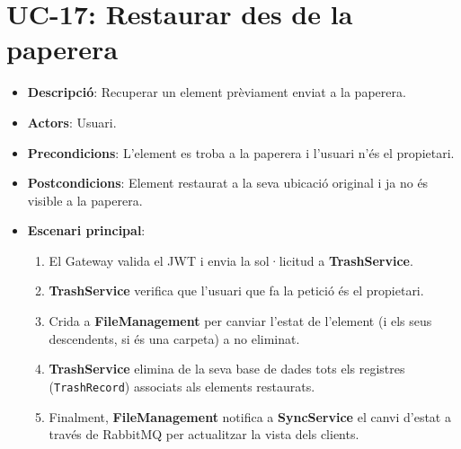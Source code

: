 \section{UC-17: Restaurar des de la paperera}
\begin{itemize}
    \item \textbf{Descripció}: Recuperar un element prèviament enviat a la paperera.
    \item \textbf{Actors}: Usuari.
    \item \textbf{Precondicions}: L'element es troba a la paperera i l'usuari n'és el propietari.
    \item \textbf{Postcondicions}: Element restaurat a la seva ubicació original i ja no és visible a la paperera.
    \item \textbf{Escenari principal}:
    \begin{enumerate}
        \item El Gateway valida el JWT i envia la sol·licitud a \textbf{TrashService}.
        \item \textbf{TrashService} verifica que l'usuari que fa la petició és el propietari.
        \item Crida a \textbf{FileManagement} per canviar l'estat de l'element (i els seus descendents, si és una carpeta) a no eliminat.
        \item \textbf{TrashService} elimina de la seva base de dades tots els registres (\texttt{TrashRecord}) associats als elements restaurats.
        \item Finalment, \textbf{FileManagement} notifica a \textbf{SyncService} el canvi d'estat a través de RabbitMQ per actualitzar la vista dels clients.
    \end{enumerate}
\end{itemize}

